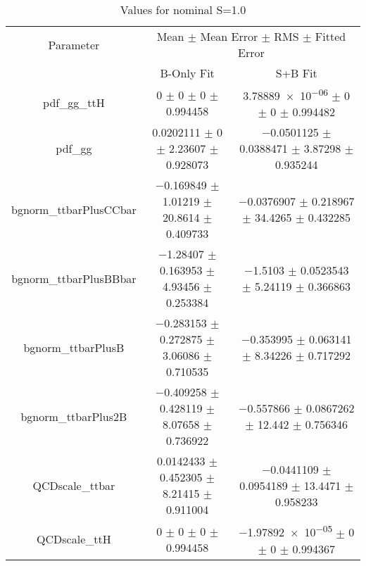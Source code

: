 \begin{table}
\centering
\caption{Values for nominal S=1.0}
\begin{tabular}{ccc}
\toprule
Parameter & \multicolumn{2}{c}{Mean $\pm$ Mean Error $\pm$ RMS $\pm$ Fitted Error}\\
 & B-Only Fit & S+B Fit\\
\midrule
pdf\_gg\_ttH & \num{0} $\pm$ \num{0} $\pm$ \num{0} $\pm$ \num{0.994458} & \num{3.78889e-06} $\pm$ \num{0} $\pm$ \num{0} $\pm$ \num{0.994482}\\
pdf\_gg & \num{0.0202111} $\pm$ \num{0} $\pm$ \num{2.23607} $\pm$ \num{0.928073} & \num{-0.0501125} $\pm$ \num{0.0388471} $\pm$ \num{3.87298} $\pm$ \num{0.935244}\\
bgnorm\_ttbarPlusCCbar & \num{-0.169849} $\pm$ \num{1.01219} $\pm$ \num{20.8614} $\pm$ \num{0.409733} & \num{-0.0376907} $\pm$ \num{0.218967} $\pm$ \num{34.4265} $\pm$ \num{0.432285}\\
bgnorm\_ttbarPlusBBbar & \num{-1.28407} $\pm$ \num{0.163953} $\pm$ \num{4.93456} $\pm$ \num{0.253384} & \num{-1.5103} $\pm$ \num{0.0523543} $\pm$ \num{5.24119} $\pm$ \num{0.366863}\\
bgnorm\_ttbarPlusB & \num{-0.283153} $\pm$ \num{0.272875} $\pm$ \num{3.06086} $\pm$ \num{0.710535} & \num{-0.353995} $\pm$ \num{0.063141} $\pm$ \num{8.34226} $\pm$ \num{0.717292}\\
bgnorm\_ttbarPlus2B & \num{-0.409258} $\pm$ \num{0.428119} $\pm$ \num{8.07658} $\pm$ \num{0.736922} & \num{-0.557866} $\pm$ \num{0.0867262} $\pm$ \num{12.442} $\pm$ \num{0.756346}\\
QCDscale\_ttbar & \num{0.0142433} $\pm$ \num{0.452305} $\pm$ \num{8.21415} $\pm$ \num{0.911004} & \num{-0.0441109} $\pm$ \num{0.0954189} $\pm$ \num{13.4471} $\pm$ \num{0.958233}\\
QCDscale\_ttH & \num{0} $\pm$ \num{0} $\pm$ \num{0} $\pm$ \num{0.994458} & \num{-1.97892e-05} $\pm$ \num{0} $\pm$ \num{0} $\pm$ \num{0.994367}\\
\bottomrule
\end{tabular}
\end{table}